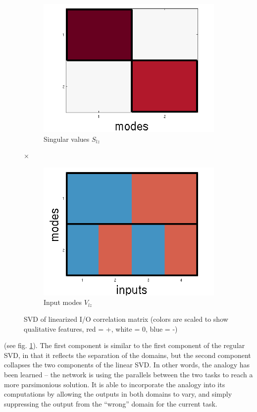 \documentclass[10pt,letterpaper]{article}
\begin{document}
\begin{figure}
\begin{subfigure}{0.22\textwidth}
\includegraphics[width=\textwidth]{figures/S_lz.png}
\caption{Singular values $S_{lz}$}
\end{subfigure}
\LARGE{$\times$}
\begin{subfigure}{0.22\textwidth}
\includegraphics[width=\textwidth]{figures/V_lz.png}
\caption{Input modes $V_{lz}$}
\end{subfigure}
\caption{SVD of linearized I/O correlation matrix (colors are scaled to show qualitative features, red = +, white = 0, blue = -)}
\label{linearized_SVD_figure}
\end{figure}
(see fig. \ref{linearized_SVD_figure}). The first component is similar to the first component of the regular SVD, in that it reflects the separation of the domains, but the second component collapses the two components of the linear SVD. In other words, the analogy has been learned -- the network is using the parallels between the two tasks to reach a more parsimonious solution. It is able to incorporate the analogy into its computations by allowing the outputs in both domains to vary, and simply suppressing the output from the ``wrong'' domain for the current task.\par
\end{document}
